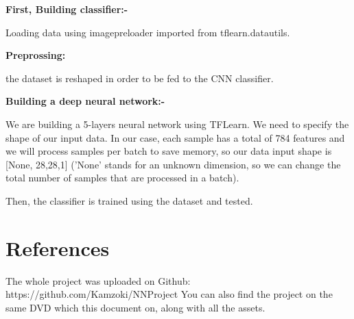 \documentclass[10pt,twocolumn,letterpaper]{article}
\begin{document}
\textbf {First, Building classifier:- }

 Loading data using imagepreloader imported from tflearn.datautils.

 \textbf {Preprossing:}

 the dataset is reshaped in order to be fed to the CNN classifier.

\textbf {Building a deep neural network:-}

We are building a 5-layers neural network using TFLearn. We need to specify the shape of our input data. In our case, each sample has a total of 784 features and we will process samples per batch to save memory, so our data input shape is [None, 28,28,1] ('None' stands for an unknown dimension, so we can change the total number of samples that are processed in a batch).

Then, the classifier is trained using the dataset and tested.
\section{References}

The whole project was uploaded on Github: https://github.com/Kamzoki/NNProject
You can also find the project on the same DVD which this document on, along with all the assets.
\end{document}
